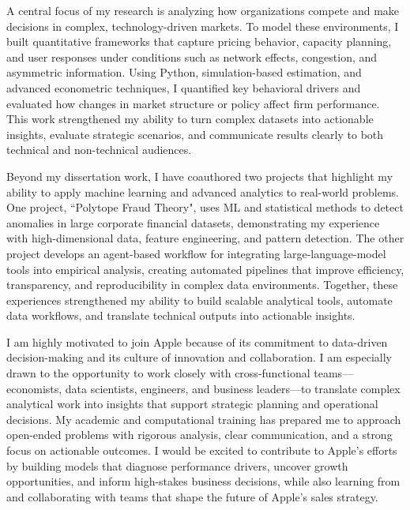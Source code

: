 \documentclass[11pt]{article}
\begin{document}
A central focus of my research is analyzing how organizations compete and make decisions in complex, technology-driven markets. 
To model these environments, I built quantitative frameworks that capture pricing behavior, capacity planning, and user responses under conditions such as network effects, congestion, and asymmetric information. 
Using Python, simulation-based estimation, and advanced econometric techniques, I quantified key behavioral drivers and evaluated how changes in market structure or policy affect firm performance. 
This work strengthened my ability to turn complex datasets into actionable insights, evaluate strategic scenarios, and communicate results clearly to both technical and non-technical audiences.

Beyond my dissertation work, I have coauthored two projects that highlight my ability to apply machine learning and advanced analytics to real-world problems. 
One project, ``Polytope Fraud Theory", uses ML and statistical methods to detect anomalies in large corporate financial datasets, demonstrating my experience with high-dimensional data, feature engineering, and pattern detection. 
The other project develops an agent-based workflow for integrating large-language-model tools into empirical analysis, creating automated pipelines that improve efficiency, transparency, and reproducibility in complex data environments. 
Together, these experiences strengthened my ability to build scalable analytical tools, automate data workflows, and translate technical outputs into actionable insights.

I am highly motivated to join Apple because of its commitment to data-driven decision-making and its culture of innovation and collaboration. 
I am especially drawn to the opportunity to work closely with cross-functional teams—economists, data scientists, engineers, and business leaders—to translate complex analytical work into insights that support strategic planning and operational decisions. 
My academic and computational training has prepared me to approach open-ended problems with rigorous analysis, clear communication, and a strong focus on actionable outcomes. 
I would be excited to contribute to Apple’s efforts by building models that diagnose performance drivers, uncover growth opportunities, and inform high-stakes business decisions, while also learning from and collaborating with teams that shape the future of Apple’s sales strategy.
\end{document}

